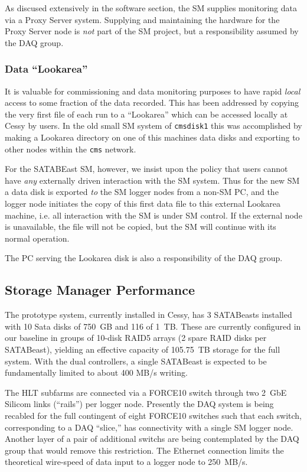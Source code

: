 As discused extensively in the software section, the SM supplies monitoring
data via a Proxy Server system.
Supplying and maintaining the hardware for the Proxy Server node 
is {\it not} part of the SM project, but a responsibility assumed by the DAQ group.


\subsubsection{Data ``Lookarea''}

It is valuable for commissioning and data monitoring purposes to have rapid
{\it local} access to some fraction of the data recorded.
This has been addressed by copying the very first file of each run 
to a ``Lookarea'' which can be accessed locally at Cessy by users.
In the old small SM system of  \verb+cmsdisk1+ this was accomplished
by making a Lookarea directory on one of this machines data disks and
exporting to other nodes within the \verb+cms+ network.


For the SATABEast SM, however, we insist upon the policy that users
cannot have {\it any} externally driven interaction with the SM system.
Thus for the new SM a data disk is exported {\it to} the SM logger nodes
from a non-SM PC, and
the logger node initiates the copy of this first data file to this
external Lookarea machine, i.e. all interaction with the SM is under
SM control.
If the external node is unavailable, the file will not be copied, but
the SM will continue with its normal operation.

The PC serving the Lookarea disk is also a responsibility of the DAQ group.




\subsection{Storage Manager Performance}

The prototype system, currently installed in Cessy, has
3 SATABeasts installed  with 10 Sata disks of 750~GB  and 116 of 1~TB.
These are currently configured in our baseline in groups of 10-disk RAID5 arrays 
(2 spare RAID disks per SATABeast), yielding an effective capacity of 105.75~TB storage
for the full system.
With the dual controllers, a single SATABeast is expected to be fundamentally 
limited to about 400 MB/s writing.

The HLT subfarms are connected via a FORCE10 switch through
two 2~GbE Silicom links (``rails'') per logger node.
Presently the DAQ system is being recabled for the full contingent of eight FORCE10 switches
such that each switch, corresponding to a DAQ ``slice,'' has connectivity with 
a single SM logger node.
Another layer of a pair of additional switchs are being contemplated by the DAQ group
that would remove this restriction.
The Ethernet connection limits the theoretical wire-speed of data input
to a logger node to 250~MB/s.

